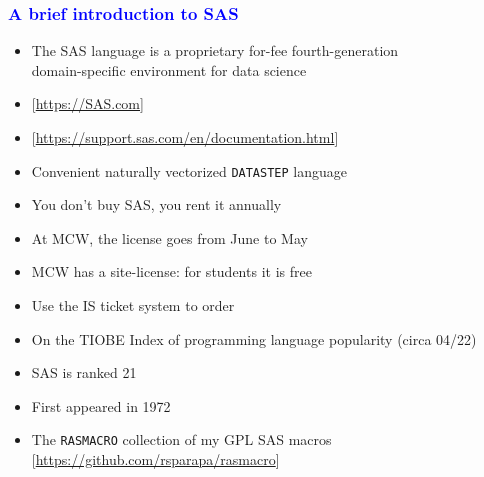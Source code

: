 \documentclass[11pt,pdftex,dvipsnames,usenames]{beamer}
\begin{document}
\begin{frame}[fragile]\frametitle{\bf\textcolor{blue}{A brief introduction to SAS}}

\begin{itemize}
\item The SAS language is a proprietary for-fee fourth-generation\\ domain-specific environment for data science
\item \textcolor{PineGreen}{[\href{https://SAS.com}{https://SAS.com}]}
\item \textcolor{PineGreen}{[\href{https://support.sas.com/en/documentation.html}{https://support.sas.com/en/documentation.html}]}
\item Convenient naturally vectorized \texttt{DATASTEP} language 
\item You don't buy SAS, you rent it annually
\item At MCW, the license goes from June to May
\item MCW has a site-license: for students it is free
\item Use the IS ticket system to order
\item On the TIOBE Index of programming language popularity (circa 04/22)
\item SAS is ranked 21 
\item First appeared in 1972
\item The \texttt{RASMACRO} collection of my GPL SAS macros 
\textcolor{PineGreen}{[\href{https://github.com/rsparapa/rasmacro}{https://github.com/rsparapa/rasmacro}]}
\end{itemize}

\end{frame}
\end{document}
